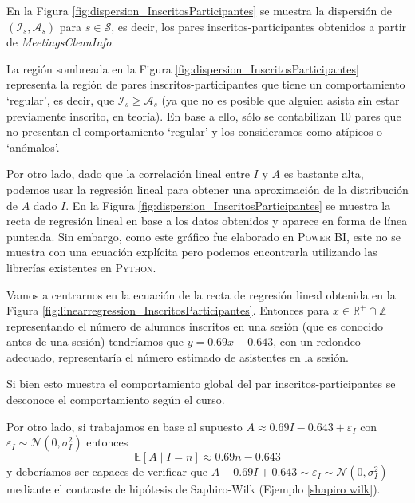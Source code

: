 \documentclass[11pt,a4paper]{book}
\theoremstyle{definition}%
\newcommand{\Real}{\mathbb{R}}
\newcommand{\Integer}{\mathbb{Z}}
\newcommand{\EV}[1]{\mathbb{E}\left[#1\right]}
\begin{document}
                En la Figura \ref{fig:dispersion_InscritosParticipantes} se muestra la dispersión de $(\mathcal{I}_s,\mathcal{A}_s)$ para $s\in\mathcal{S}$, es decir, los pares inscritos-participantes obtenidos a partir de \textit{MeetingsCleanInfo}.
                
                La región sombreada en la Figura \ref{fig:dispersion_InscritosParticipantes} representa la región de pares inscritos-participantes que tiene un comportamiento `regular', es decir, que $\mathcal{I}_s\geq \mathcal{A}_s$ (ya que no es posible que alguien asista sin estar previamente inscrito, en teoría). En base a ello, sólo se contabilizan $10$ pares que no presentan el comportamiento `regular' y los consideramos como atípicos o `anómalos'.

                Por otro lado, dado que la correlación lineal entre $I$ y $A$ es bastante alta, podemos usar la regresión lineal para obtener una aproximación de la distribución de $A$ dado $I$. En la Figura \ref{fig:dispersion_InscritosParticipantes} se muestra la recta de regresión lineal en base a los datos obtenidos y aparece en forma de línea punteada. Sin embargo, como este gráfico fue elaborado en \textsc{Power BI}, este no se muestra con una ecuación explícita pero podemos encontrarla utilizando las librerías existentes en \textsc{Python}.

                Vamos a centrarnos en la ecuación de la recta de regresión lineal obtenida en la Figura \ref{fig:linearregression_InscritosParticipantes}. Entonces para $x\in\Real^+\cap\Integer$ representando el número de alumnos inscritos en una sesión (que es conocido antes de una sesión) tendríamos que $y=0.69x-0.643$, con un redondeo adecuado, representaría el número estimado de asistentes en la sesión.

                Si bien esto muestra el comportamiento global del par inscritos-participantes se desconoce el comportamiento según el curso.

                Por otro lado, si trabajamos en base al supuesto $A\approx0.69I-0.643+\varepsilon_I$ con $\varepsilon_I\sim\mathcal{N}(0,\sigma_I^2)$ entonces
                \begin{equation*}
                    \EV{A\mid I=n}\approx 0.69n-0.643
                \end{equation*}
                y deberíamos ser capaces de verificar que $A-0.69I+0.643\sim\varepsilon_I\sim\mathcal{N}(0,\sigma_I^2)$ mediante el contraste de hipótesis de Saphiro-Wilk (Ejemplo \ref{shapiro wilk}).
 
\end{document}
